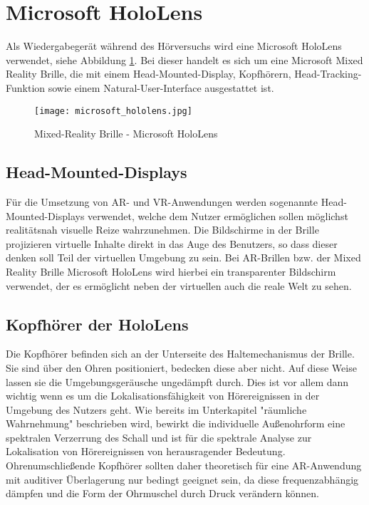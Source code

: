 \section{Microsoft HoloLens}
Als Wiedergabegerät während des Hörversuchs wird eine Microsoft HoloLens verwendet, siehe Abbildung \ref{fig:microsoft_hololens}. Bei dieser handelt es sich um eine Microsoft Mixed Reality Brille, die mit einem Head-Mounted-Display, Kopfhörern, Head-Tracking-Funktion sowie einem Natural-User-Interface ausgestattet ist.

 \begin{figure}[H]
\centering
\texttt{[image: microsoft\_hololens.jpg]}
\caption{Mixed-Reality Brille - Microsoft HoloLens}


\label{fig:microsoft_hololens}
\end{figure}

\subsection{Head-Mounted-Displays}
Für die Umsetzung von AR- und VR-Anwendungen werden sogenannte Head-Mounted-Displays verwendet, welche dem Nutzer ermöglichen sollen möglichst realitätsnah visuelle Reize wahrzunehmen. Die Bildschirme in der Brille projizieren virtuelle Inhalte direkt in das Auge des Benutzers, so dass dieser denken soll Teil der virtuellen Umgebung zu sein. Bei AR-Brillen bzw. der Mixed Reality Brille Microsoft HoloLens wird hierbei ein transparenter Bildschirm verwendet, der es ermöglicht neben der virtuellen auch die reale Welt zu sehen.\\


\subsection{Kopfhörer der HoloLens}
Die Kopfhörer befinden sich an der Unterseite des Haltemechanismus der Brille. Sie sind über den Ohren positioniert, bedecken diese aber nicht. Auf diese Weise lassen sie die Umgebungsgeräusche ungedämpft durch. Dies ist vor allem dann wichtig wenn es um die Lokalisationsfähigkeit von Hörereignissen in der Umgebung des Nutzers geht. Wie bereits im Unterkapitel "räumliche Wahrnehmung" beschrieben wird, bewirkt die individuelle Außenohrform eine spektralen Verzerrung des Schall und ist für die spektrale Analyse zur Lokalisation von Hörereignissen von herausragender Bedeutung. Ohrenumschließende Kopfhörer sollten daher theoretisch für eine AR-Anwendung mit auditiver Überlagerung nur bedingt geeignet sein, da diese frequenzabhängig dämpfen und die Form der Ohrmuschel durch Druck verändern können.

